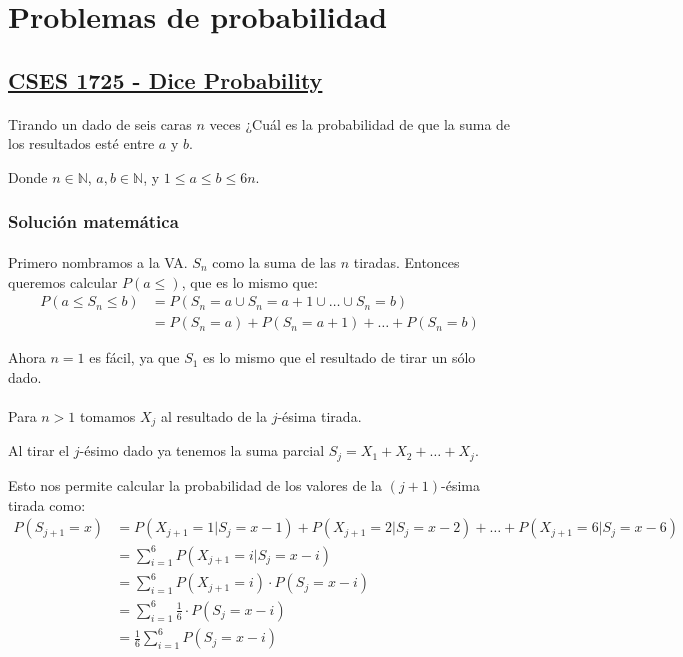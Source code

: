 \documentclass[../main.tex]{subfiles}
\begin{document}
\section{Problemas de probabilidad}

\subsection{\href{https://cses.fi/problemset/task/1725/}{CSES 1725 - Dice Probability}}
\paragraph{} Tirando un dado de seis caras \(n\) veces ¿Cuál es la probabilidad de que la suma de los resultados esté entre \(a\) y \(b\).

Donde \(n \in \mathbb{N}\), \(a, b \in \mathbb{N}\), y \(1 \leq a \leq b \leq 6n\).

\subsubsection{Solución matemática}

\paragraph{} Primero nombramos a la VA. \(S_{n}\) como la suma de las \(n\) tiradas. Entonces queremos calcular \(P(a \leq )\), que es lo mismo que:
\begin{align*}
  P(a \leq S_{n} \leq b) &= P(S_{n} = a \cup S_{n} = a+1 \cup \ldots \cup S_{n} = b) \\
                         &= P(S_{n} = a) + P(S_{n} = a+1) + \ldots + P(S_{n} = b)
\end{align*}

Ahora \(n = 1\) es fácil, ya que \(S_{1}\) es lo mismo que el resultado de tirar un sólo dado.

\paragraph{} Para \(n > 1\) tomamos \(X_{j}\) al resultado de la \(j\)-ésima tirada.

Al tirar el \(j\)-ésimo dado ya tenemos la suma parcial \(S_{j} = X_{1} + X_{2} + \ldots + X_{j}\).

Esto nos permite calcular la probabilidad de los valores de la \((j+1)\)-ésima tirada como:
\begin{align*}
  P(S_{j+1} = x) &= P(X_{j+1} = 1 | S_{j} = x - 1) + P(X_{j+1} = 2 | S_{j} = x - 2) + \ldots + P(X_{j+1} = 6 | S_{j} = x - 6) \\
                &= \sum_{i = 1}^{6}P(X_{j+1} = i | S_{j} = x - i) \\
                &= \sum_{i = 1}^{6}P(X_{j+1} = i) \cdot P(S_{j} = x - i) \\
                &= \sum_{i = 1}^{6}\frac{1}{6} \cdot P(S_{j} = x - i) \\
                &= \frac{1}{6}\sum_{i = 1}^{6}P(S_{j} = x - i) \\
\end{align*}
\end{document}
